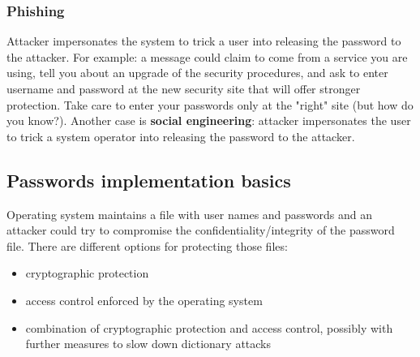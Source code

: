 \documentclass[a4paper, 10pt, titlepage]{article}
\begin{document}
\subsubsection*{Phishing}
Attacker impersonates the system to trick a user into releasing the password to the attacker. For example: a message could claim to come from a service you are using, tell you about an upgrade of the security procedures, and ask to enter username and password at the new security site that will offer stronger protection.
Take care to enter your passwords only at the "right" site (but how do you know?). Another case is \textbf{social engineering}: attacker impersonates the user to trick a system operator into releasing the password to the attacker.

\subsection{Passwords implementation basics}
Operating system maintains a file with user names and passwords and an attacker could try to compromise the confidentiality/integrity of the password file. There are different options for protecting those files:
\begin{itemize}
\item cryptographic protection
\item access control enforced by the operating system
\item combination of cryptographic protection and access control, possibly with further measures to slow down dictionary attacks
\end{itemize}
\end{document}
